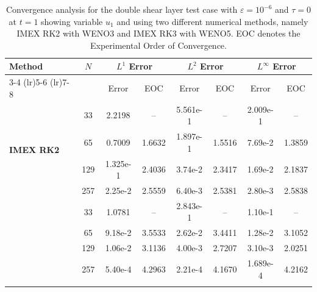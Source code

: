 \documentclass[final,11pt]{siamart251216}
\numberwithin{equation}{section}
\theoremstyle{definition}
\theoremstyle{remark}
\begin{document}
%
%
%
\begin{table}[htbp]
    \centering
    \small
    \begin{tabular}{@{} l c cc cc cc @{}}
        \toprule
        \multirow{2}{*}{\textbf{Method}} & \multirow{2}{*}{$N$} & \multicolumn{2}{c}{\textbf{$L^1$ Error}} & \multicolumn{2}{c}{\textbf{$L^2$ Error}} & \multicolumn{2}{c}{\textbf{$L^\infty$ Error}} \\
        \cmidrule(lr){3-4} \cmidrule(lr){5-6} \cmidrule(lr){7-8}
        & & Error & EOC & Error & EOC & Error & EOC \\
        \midrule
        \multirow{4}{*}{\textbf{IMEX RK2}} 
        & 33  & 2.2198 & --   & 5.561e-1 & --   & 2.009e-1 & --   \\
       & 65  & 0.7009 & 1.6632 & 1.897e-1 & 1.5516 & 7.69e-2 & 1.3859 \\
       & 129  & 1.325e-1 & 2.4036 & 3.74e-2 & 2.3417 & 1.69e-2 & 2.1837 \\
        & 257  & 2.25e-2 & 2.5559 & 6.40e-3 & 2.5381 & 2.80e-3 & 2.5838 \\
        
        \addlinespace[0.3cm]
        \multirow{4}{*}{\textbf{IMEX RK3}} 
        & 33  & 1.0781 & --   & 2.843e-1 & --   & 1.10e-1 & --   \\
        & 65  & 9.18e-2 & 3.5533 & 2.62e-2 & 3.4411 & 1.28e-2 & 3.1052 \\
        & 129  & 1.06e-2 & 3.1136 & 4.00e-3 & 2.7207 & 3.10e-3 & 2.0251 \\
        & 257  & 5.40e-4 & 4.2963 & 2.21e-4 & 4.1670 & 1.689e-4 & 4.2162 \\
 \\
        
        
        \bottomrule
    \end{tabular}
    \caption{Convergence analysis for the double shear layer test case with $\varepsilon = 10^{-6}$ and $\tau = 0$ at $t = 1$ showing variable $u_1$ and using two different numerical methods, namely IMEX RK2 with WENO3 and IMEX RK3 with WENO5. EOC denotes the Experimental Order of Convergence.}
    \label{tab:convergence_u1}
\end{table}
\end{document}

